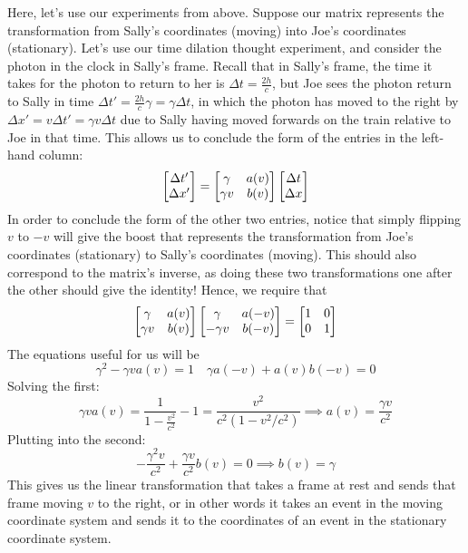 \documentclass[12pt]{scrartcl}
\begin{document}
Here, let's use our experiments from above. Suppose our matrix represents the transformation from Sally's coordinates (moving) into Joe's coordinates (stationary). Let's use our time dilation thought experiment, and consider the photon in the clock in Sally's frame. Recall that in Sally's frame, the time it takes for the photon to return to her is $\Delta t = \frac{2h}{c}$, but Joe sees the photon return to Sally in time $\Delta t' = \frac{2h}{c}\gamma = \gamma \Delta t$, in which the photon has moved to the right by $\Delta x' = v \Delta t' = \gamma v \Delta t$ due to Sally having moved forwards on the train relative to Joe in that time. This allows us to conclude the form of the entries in the left-hand column:
\[
	\begin{bmatrix}\Delta t' \\ \Delta x'\end{bmatrix} = \begin{bmatrix}\gamma & a(v) \\ \gamma v & b(v)\end{bmatrix} \begin{bmatrix} \Delta t \\ \Delta x \end{bmatrix}
\]
In order to conclude the form of the other two entries, notice that simply flipping $v$ to $-v$ will give the boost that represents the transformation from Joe's coordinates (stationary) to Sally's coordinates (moving). This should also correspond to the matrix's inverse, as doing these two transformations one after the other should give the identity! Hence, we require that
\[
	\begin{bmatrix}\gamma & a(v) \\ \gamma v & b(v)\end{bmatrix} \begin{bmatrix}\gamma & a(-v) \\ -\gamma v & b(-v)\end{bmatrix} = \begin{bmatrix}1 & 0 \\ 0 & 1\end{bmatrix}
\]
The equations useful for us will be
\[
	\gamma^2 - \gamma v a(v) = 1 \quad \gamma a(-v) + a(v) b(-v) = 0
\]
Solving the first:
\[
	\gamma v a(v) = \frac{1}{1 - \frac{v^2}{c^2}} - 1 = \frac{v^2}{c^2(1 - v^2/c^2)} \implies a(v) = \frac{\gamma v}{c^2}
\]
Plutting into the second:
\[
	-\frac{\gamma^2 v}{c^2} + \frac{\gamma v}{c^2} b(v) = 0 \implies b(v) = \gamma
\]
This gives us the linear transformation that takes a frame at rest and sends that frame moving $v$ to the right, or in other words it takes an event in the moving coordinate system and sends it to the coordinates of an event in the stationary coordinate system.
\end{document}
